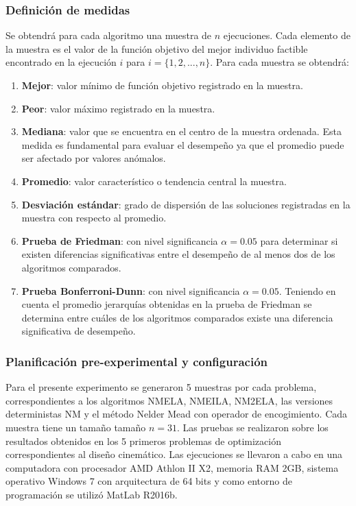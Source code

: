  \subsubsection{Definición de medidas}
 Se obtendrá para cada algoritmo una muestra de $n$ ejecuciones. Cada elemento de la muestra es el valor de la función objetivo del mejor individuo factible encontrado en la ejecución $i$ para $i= \{ 1,2,...,n\}$. Para cada muestra se obtendrá:
 \begin{enumerate}
 	\item \textbf{Mejor}: valor mínimo de función objetivo registrado en la muestra.
 	\item \textbf{Peor}: valor máximo registrado en la muestra.
 	\item \textbf{Mediana}: valor que se encuentra en el centro de la muestra ordenada. Esta medida es fundamental para evaluar el desempeño ya que el promedio puede ser afectado por valores anómalos. 
 	\item \textbf{Promedio}: valor característico o tendencia central la muestra.
 	\item \textbf{Desviación estándar}: grado de dispersión de las soluciones registradas en la muestra con respecto al promedio.
 	\item \textbf{Prueba de Friedman}: con nivel significancia $\alpha=0.05$ para determinar si existen diferencias significativas entre el desempeño de al menos dos de los algoritmos comparados. 
 	\item \textbf{Prueba Bonferroni-Dunn}: con nivel significancia $\alpha=0.05$. Teniendo en cuenta el promedio jerarquías obtenidas en la prueba de Friedman se determina entre cuáles de los algoritmos comparados existe una diferencia significativa de desempeño.

 \end{enumerate}
 \subsubsection{Planificación pre-experimental y configuración}
 Para el presente experimento se generaron 5 muestras por cada problema, correspondientes a los algoritmos NMELA, NMEILA, NM2ELA, las versiones deterministas NM y el método Nelder Mead con operador de encogimiento. Cada muestra tiene un tamaño tamaño $n=31$. Las pruebas se realizaron sobre los resultados obtenidos en los 5 primeros problemas de optimización correspondientes al diseño cinemático. Las ejecuciones se llevaron a cabo en una computadora con procesador AMD Athlon II X2, memoria RAM 2GB, sistema operativo Windows 7 con arquitectura de 64 bits y como entorno de programación se utilizó  MatLab R2016b. 
 
